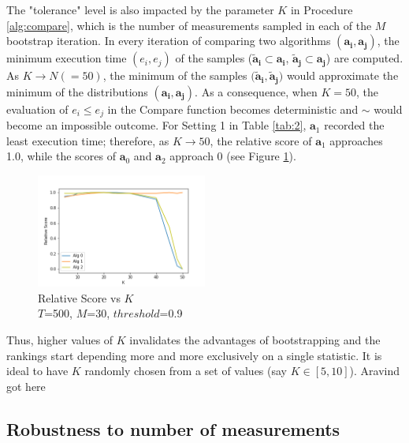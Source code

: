 \documentclass[conference]{IEEEtran}
\newcommand{\ar}[1]{{\color{red}#1}}
\begin{document}
The "tolerance" level is also impacted by the parameter $K$ in Procedure \ref{alg:compare}, which is the number of measurements sampled in each of the $M$ bootstrap iteration. In every iteration of comparing two algorithms $(\mathbf{a_i}, \mathbf{a_j})$, the minimum execution time $(e_i,e_j)$ of the samples ($\mathbf{\tilde{a}_i} \subset \mathbf{a_i}$, $\mathbf{\tilde{a}_j} \subset \mathbf{a_j}$) are computed. As $K \to N (=50)$, the minimum of the samples $(\mathbf{\tilde{a}_i},\mathbf{\tilde{a}_j)}$ would approximate the minimum of the distributions $(\mathbf{a_i}, \mathbf{a_j})$. As a consequence, when $K=50$, the evaluation of $e_i \le e_j$ in the Compare function becomes deterministic and $\sim$ would become an impossible outcome. For Setting 1 in Table \ref{tab:2}, $\mathbf{a}_1$ recorded the least execution time; therefore, as $K \to 50$, the relative score of $\mathbf{a}_1$ approaches 1.0, while the scores of $\mathbf{a}_0$ and $\mathbf{a}_2$ approach 0 (see Figure \ref{fig:k}). 
\begin{figure}[h!]
	\includegraphics[width=0.5\textwidth]{fig/k}
	\caption{Relative Score vs $K$ \\ $T$=500, $M$=30, $threshold$=0.9}
	\label{fig:k}     
\end{figure}
Thus, higher values of $K$ invalidates the advantages of bootstrapping and  the rankings start depending more and more exclusively on a single statistic. It is ideal to have $K$ randomly chosen from a set of values (say $K \in [5,10]$).
\ar{Aravind got here}
\subsection{Robustness to number of measurements}
\end{document}
